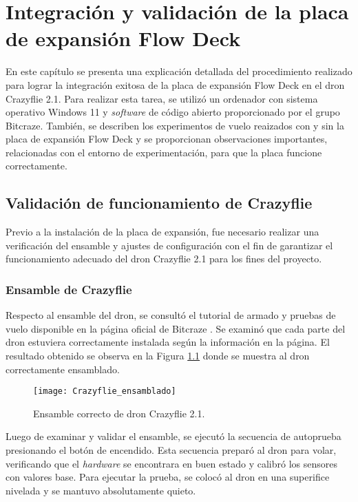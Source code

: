 \chapter{Integración y validación de la placa de expansión Flow Deck}
En este capítulo se presenta una explicación detallada del procedimiento realizado para lograr la integración exitosa de la placa de expansión Flow Deck en el dron Crazyflie 2.1. Para realizar esta tarea, se utilizó un ordenador con sistema operativo Windows 11 y \textit{software} de código abierto proporcionado por el grupo Bitcraze. También, se describen los experimentos de vuelo reaizados con y sin la placa de expansión Flow Deck y se proporcionan observaciones importantes, relacionadas con el entorno de experimentación, para que la placa funcione correctamente.

\section{Validación de funcionamiento de Crazyflie}
Previo a la instalación de la placa de expansión, fue necesario realizar una verificación del ensamble y ajustes de configuración con el fin de garantizar el funcionamiento adecuado del dron Crazyflie 2.1 para los fines del proyecto.

\subsection{Ensamble de Crazyflie}
Respecto al ensamble del dron, se consultó el tutorial de armado y pruebas de vuelo disponible en la página oficial de Bitcraze \cite{Crazyflie_tutorial_ensamble}. Se examinó que cada parte del dron estuviera correctamente instalada según la información en la página. El resultado obtenido se observa en la Figura \ref{fig:Crazyflie_ensamble} donde se muestra al dron correctamente ensamblado. 

\begin{figure}[htbp]
	\centering
	\texttt{[image: Crazyflie\_ensamblado]}
	\caption{Ensamble correcto de dron Crazyflie 2.1.}
	\label{fig:Crazyflie_ensamble}
\end{figure}

Luego de examinar y validar el ensamble, se ejecutó la secuencia de autoprueba presionando el botón de encendido. Esta secuencia preparó al dron para volar, verificando que el \textit{hardware} se encontrara en buen estado y calibró los sensores con valores base. Para ejecutar la prueba, se colocó al dron en una superifice nivelada y se mantuvo absolutamente quieto.

